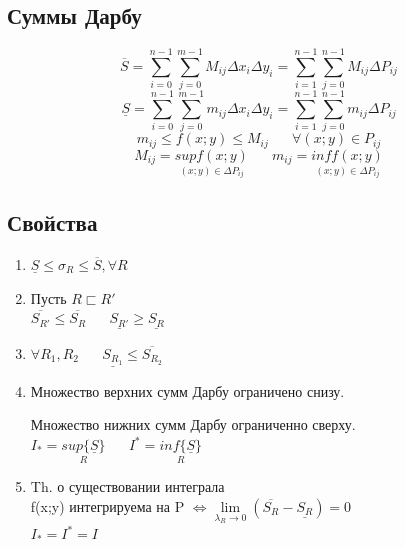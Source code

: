 \documentclass[12pt]{article}
\let\oldsum\sum
\let\oldlim\lim
\renewcommand{\sum}{\oldsum\limits}
\renewcommand{\lim}{\oldlim\limits}
\begin{document}
  \subsection{Суммы Дарбу}
  \[\overline{S}=\sum_{i=0}^{n-1} \sum_{j=0}^{m-1} M_{ij}\Delta x_i \Delta y_i = \sum_{i=1}^{n-1} \sum_{j=0}^{n-1}M_{ij}\Delta P_{ij}\]
  \[\underline{S}=\sum_{i=0}^{n-1} \sum_{j=0}^{m-1} m_{ij}\Delta x_i \Delta y_i = \sum_{i=1}^{n-1} \sum_{j=0}^{n-1}m_{ij}\Delta P_{ij}\]
  \[m_{ij} \leq f(x;y) \leq M_{ij} \hspace{20pt} \forall(x;y)\in P_{ij}\]
  \[M_{ij}=\underset{(x;y) \in \Delta P_{ij}}{sup f(x;y)} \hspace{20pt} m_{ij}=\underset{(x;y) \in \Delta P_{ij}}{inf f(x;y)} \]
  \subsection*{Свойства}
  \begin{enumerate}
    \item $\underline{S}\leq \sigma_R \leq \overline{S}, \forall R$
    \item Пусть $R \sqsubset R'$\\
    $\overline{S_{R'}}\leq \overline{S_{R}} \hspace{20pt} \underline{S_{R'}}\geq \underline{S_{R}}$
    \item $\forall R_1,R_2 \hspace{20pt} \underline{S_{R_1}}\leq \overline{S_{R_2}}$
    \item Множество верхних сумм Дарбу ограничено снизу.\par
    Множество нижних сумм Дарбу ограниченно сверху.\\
    $I_*=\underset{R}{sup \{\underline{S}\}} \hspace{20pt} I^*=\underset{R}{inf \{\underline{S}\}}$
    \item Th. о существовании интеграла\\
    f(x;y) интегрируема на P $\Leftrightarrow \lim_{\lambda_R \to 0} (\overline{S_R}-\underline{S_R})=0$\\
    $I_*=I^*=I$
  \end{enumerate}
\end{document}
